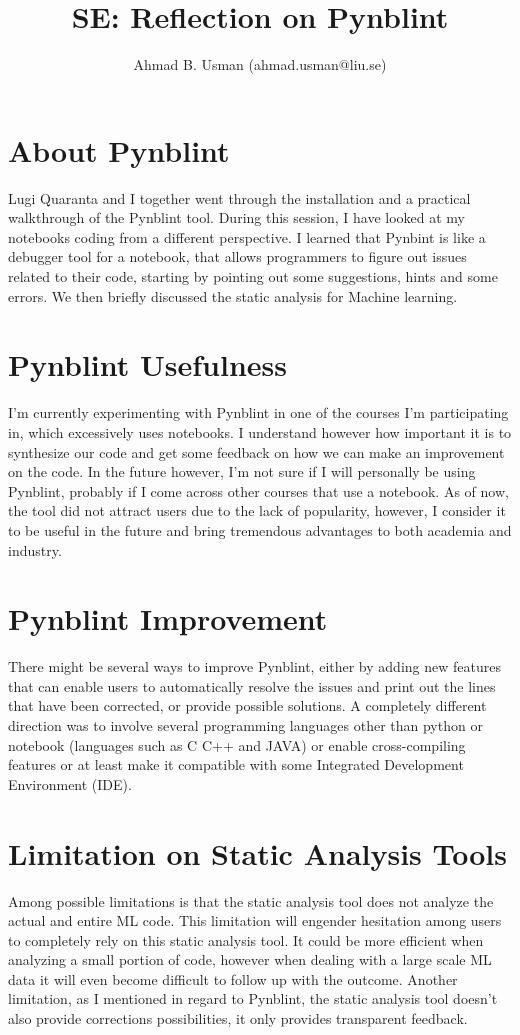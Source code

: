 \documentclass{article}
\title{SE: Reflection on Pynblint}
\author{Ahmad B. Usman  (ahmad.usman@liu.se)}
\begin{document}
\maketitle
\section{About Pynblint}
Lugi Quaranta and I together went through the installation and a practical walkthrough of the Pynblint tool. During this session, I have looked at my notebooks coding from a different perspective. I learned that Pynbint is like a debugger tool for a notebook, that allows programmers to figure out issues related to their code, starting by pointing out some suggestions, hints and some errors. We then briefly discussed the static analysis for Machine learning. 
\section{Pynblint Usefulness}
I’m currently  experimenting with Pynblint in one of the courses I’m participating in, which excessively uses notebooks. I understand however how important it is to synthesize our code and get some feedback on how we can make an improvement on the code. In the future however, I’m not sure if I will personally be using Pynblint, probably if I come across other courses that use a notebook. As of now, the tool did not attract users due to the lack of popularity, however, I consider it to be useful in the future and bring tremendous advantages to both academia and industry.

\section{Pynblint Improvement}

There might be several ways to improve Pynblint, either by adding new features that can enable users to automatically resolve the issues and print out the lines that have been corrected, or  provide possible solutions. A completely  different direction was to involve several programming languages other than python or  notebook (languages such as C C++ and JAVA) or enable cross-compiling features or at least make it compatible  with some Integrated Development Environment (IDE).


\section{Limitation on Static Analysis Tools}

Among possible limitations is that the static analysis tool  does not analyze the actual and entire ML code. This limitation will engender hesitation among users to completely rely on this static analysis tool. It could be more efficient when analyzing a small portion of code, however when dealing with a large scale ML data it will even become difficult to follow up with the outcome.  Another limitation, as I mentioned in regard to Pynblint, the static analysis tool doesn’t also provide corrections possibilities, it only provides transparent feedback.
\end{document}
